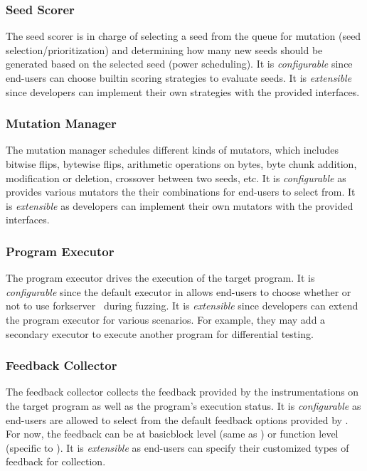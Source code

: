 \subsubsection{Seed Scorer}
The seed scorer is in charge of selecting a seed from the queue for mutation (seed selection/prioritization) and determining how many new seeds should be generated based on the selected seed (power scheduling).
It is \textit{configurable} since end-users can choose builtin scoring strategies to evaluate seeds.
It is \textit{extensible} since developers can implement their own strategies with the provided interfaces.


\subsubsection{Mutation Manager}
The mutation manager schedules different kinds of mutators, which includes bitwise flips, bytewise flips, arithmetic operations on bytes, byte chunk addition, modification or deletion, crossover between two seeds, etc.
It is \textit{configurable} as {\FOT} provides various mutators the their combinations for end-users to select from.
It is \textit{extensible} as developers can implement their own mutators with the provided interfaces.

\subsubsection{Program Executor}
The program executor drives the execution of the target program.
It is \textit{configurable} since the default executor in {\FOT} allows end-users to choose whether or not to use forkserver~\cite{afl} during fuzzing.
It is \textit{extensible} since developers can extend the program executor for various scenarios.
For example, they may add a secondary executor to execute another program for differential testing.

\subsubsection{Feedback Collector}
The feedback collector collects the feedback provided by the instrumentations on the target program as well as the program's execution status.
It is \textit{configurable} as end-users are allowed to select from the default feedback options provided by {\FOT}.
For now, the feedback can be at basicblock level (same as {\AFL}) or function level (specific to \FOT).
It is \textit{extensible} as end-users can specify their customized types of feedback for collection.

